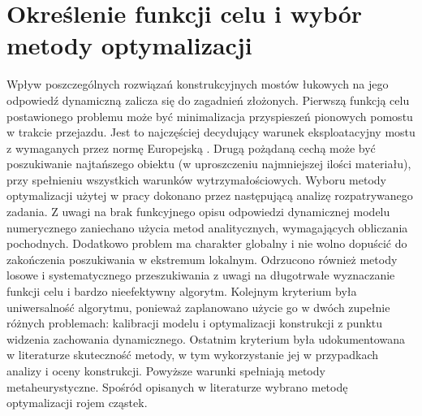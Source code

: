 \section{Określenie funkcji celu i wybór metody optymalizacji}
Wpływ poszczególnych rozwiązań konstrukcyjnych mostów łukowych na jego odpowiedź dynamiczną zalicza się do zagadnień złożonych. 
Pierwszą funkcją celu postawionego problemu może być minimalizacja przyspieszeń pionowych pomostu w trakcie przejazdu. Jest to najczęściej decydujący warunek eksploatacyjny mostu z wymaganych przez normę Europejską \parencite{PKNc}. Drugą pożądaną cechą może być poszukiwanie najtańszego obiektu (w uproszczeniu najmniejszej ilości materiału), przy spełnieniu wszystkich warunków wytrzymałościowych. Wyboru metody optymalizacji użytej w pracy dokonano przez następującą analizę rozpatrywanego zadania. Z uwagi na brak funkcyjnego opisu odpowiedzi dynamicznej modelu numerycznego zaniechano użycia metod analitycznych, wymagających obliczania pochodnych. Dodatkowo problem ma charakter globalny i nie wolno dopuścić do zakończenia poszukiwania w ekstremum lokalnym.  Odrzucono również metody losowe i systematycznego przeszukiwania z uwagi na długotrwałe wyznaczanie funkcji celu i bardzo nieefektywny algorytm. Kolejnym kryterium była uniwersalność algorytmu, ponieważ zaplanowano użycie go w dwóch zupełnie różnych problemach: kalibracji modelu i optymalizacji konstrukcji z punktu widzenia zachowania dynamicznego. Ostatnim kryterium była udokumentowana w literaturze skuteczność metody, w tym wykorzystanie jej w przypadkach analizy i oceny konstrukcji. Powyższe warunki spełniają metody metaheurystyczne. Spośród opisanych w literaturze wybrano metodę optymalizacji rojem cząstek.
